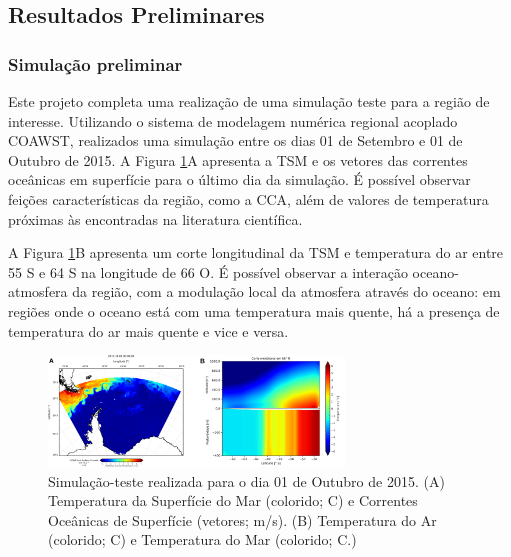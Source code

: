 \documentclass{article}
\begin{document}
\subsection{Resultados Preliminares}
\bigskip

\subsubsection{Simulação preliminar}
\bigskip

Este projeto completa uma realização de uma simulação teste para a região de interesse. Utilizando o sistema de modelagem numérica
regional acoplado COAWST, realizados uma simulação entre os dias 01 de Setembro e 01 de Outubro de 2015. 
A \textcolor{bleu_cite}{Figura \ref{figroms}A} apresenta a TSM e os vetores das correntes oceânicas em superfície para o último dia da
simulação. É possível observar feições características da região, como a CCA, além de valores de temperatura próximas às encontradas na 
literatura científica. 

A \textcolor{bleu_cite}{Figura \ref{figroms}B} apresenta um corte longitudinal da TSM e temperatura do ar entre 55 \textdegree{}S e 64 \textdegree{}S na longitude de 
66 \textdegree{}O. É possível observar a interação oceano-atmosfera da região, com a modulação local da atmosfera através do oceano: em regiões
onde o oceano está com uma temperatura mais quente, há a presença de temperatura do ar mais quente e vice e versa.
\bigskip

\begin{figure}[H]
    \centering
    \includegraphics[width=0.7\textwidth]{img/wrf_roms.png}
	\caption{Simulação-teste realizada para o dia 01 de Outubro de 2015. (A) Temperatura da Superfície do Mar (colorido; \textdegree{}C) e Correntes Oceânicas de Superfície (vetores; m/s). (B) Temperatura do Ar (colorido; \textdegree{}C) e Temperatura do Mar (colorido; \textdegree{}C.) 
	}
	\label{figroms}
\end{figure}
\end{document}
